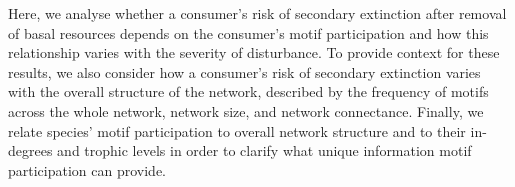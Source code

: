 \documentclass[12pt]{article}
\begin{document}
\begin{spacing}{2.0}
    
    Here, we analyse whether a consumer's risk of secondary extinction after removal of basal resources depends on the consumer's motif participation and how this relationship varies with the severity of disturbance.
    To provide context for these results, we also consider how a consumer's risk of secondary extinction varies with the overall structure of the network, described by the frequency of motifs across the whole network, network size, and network connectance.
    Finally, we relate species' motif participation to overall network structure and to their in-degrees and trophic levels in order to clarify what unique information motif participation can provide.


    





\end{spacing}
\end{document}
